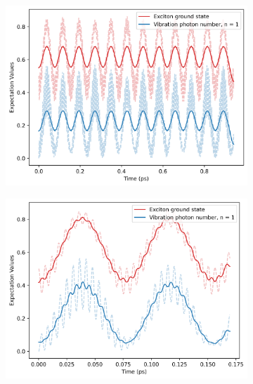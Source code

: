 \documentclass[12pt]{article}
\begin{document}
\begin{figure}[H]
    \centering
    \begin{subfigure}{0.49\textwidth}
        \centering
        \includegraphics[width=\linewidth]{Research Project/Code/results/ExVib/Closed/Envelope/pops_ground_eg.png}
        \caption{}
        \label{fig:EVM_CQS_Pop_env_eg}
    \end{subfigure}
    \hfill
    \begin{subfigure}{0.49\textwidth}
        \centering
        \includegraphics[width=\linewidth]{Research Project/Code/results/ExVib/Closed/Fast/pops_ground_eg.png}
        \caption{}
        \label{fig:EVM_CQS_Pop_fast_eg}
    \end{subfigure}
    
    \caption{}
    \label{fig:EVM_CQS_Pops_eg}
\end{figure}
\end{document}
